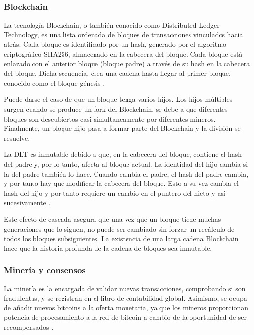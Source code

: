 \subsubsection{Blockchain}

La tecnología Blockchain, o también conocido como Distributed Ledger Technology, es una lista ordenada de bloques de 
transacciones vinculados hacia atrás. Cada bloque es identificado por un hash, generado por el algoritmo criptográfico 
SHA256, almacenado en la cabecera del bloque. Cada bloque está enlazado con el anterior bloque (bloque padre) a través 
de su hash en la cabecera del bloque. Dicha secuencia, crea una cadena hasta llegar al primer bloque, conocido como 
el bloque génesis \cite{antonopoulos2014mastering}.

\vspace{5mm}

\noindent Puede darse el caso de que un bloque tenga varios hijos. Los hijos múltiples surgen cuando se produce un fork 
del Blockchain, se debe a que diferentes bloques son descubiertos casi simultaneamente por diferentes mineros. 
Finalmente, un bloque hijo pasa a formar parte del Blockchain y la división se resuelve. 

\vspace{5mm}

\noindent La DLT es inmutable debido a que, en la cabecera del bloque, contiene el hash del padre y, por lo tanto, 
afecta al bloque actual. La identidad del hijo cambia si la del padre también lo hace. Cuando cambia el padre, el 
hash del padre cambia, y por tanto hay que modificar la cabecera del bloque. Esto a su vez cambia el hash del hijo y 
por tanto requiere un cambio en el puntero del nieto y así sucesivamente \cite{antonopoulos2014mastering}.

\vspace{5mm}

\noindent Este efecto de cascada asegura que una vez que un bloque tiene muchas generaciones que lo siguen, no puede 
ser cambiado sin forzar un recálculo de todos los bloques subsiguientes. La existencia de una larga cadena Blockchain 
hace que la historia profunda de la cadena de bloques sea inmutable.

\subsubsection{Minería y consensos}

La minería es la encargada de validar nuevas transacciones, comprobando si son fradulentas, y se registran en el 
libro de contabilidad global. Asimismo, se ocupa de añadir nuevos bitcoins a la oferta monetaria, ya que los 
mineros proporcionan potencia de procesamiento a la red de bitcoin a cambio de la oportunidad de ser recompensados 
\cite{antonopoulos2014mastering}.

